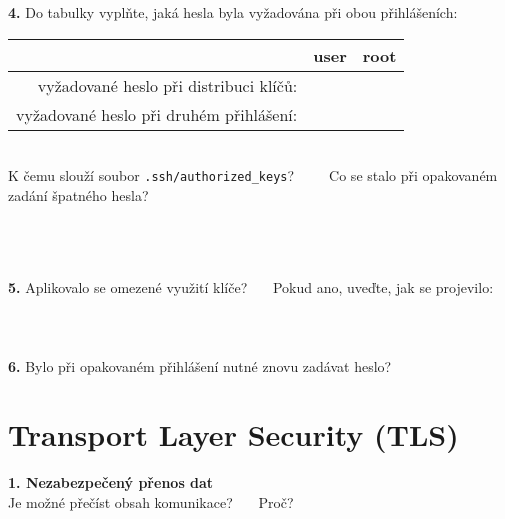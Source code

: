 \documentclass[a4paper,11pt]{article}
\begin{document}
\textbf{4.} Do tabulky vyplňte, jaká hesla byla vyžadována při obou přihlášeních:
~\\
\begin{tabular}{|r|c|c|}
\hline
~ & user & root \\
\hline
vyžadované heslo při distribuci klíčů: & \hspace{3cm} & \hspace{3cm} \\
\hline
vyžadované heslo při druhém přihlášení: & \hspace{3cm} & \hspace{3cm} \\
\hline
\end{tabular}
\vspace{1em}

~\\
K čemu slouží soubor \texttt{.ssh/authorized\_keys}?~~~~~Co se stalo při opakovaném zadání špatného hesla?
~\\
~\\
~\\
\underline{\hspace{7.8cm}}~\hspace{0.5cm}~\underline{\hspace{8.4cm}}

\newpage %

\textbf{5.} Aplikovalo se omezené využití klíče? \underline{\hspace{1cm}} ~~~Pokud ano, uveďte, jak se projevilo:
~\\
~\\
~\\
\underline{\hspace{16.5cm}}
~\\


\textbf{6.} Bylo při opakovaném přihlášení nutné znovu zadávat heslo? \underline{\hspace{1cm}}


\section{Transport Layer Security (TLS)}

\textbf{1. Nezabezpečený přenos dat}\\
Je možné přečíst obsah komunikace? \underline{\hspace{1cm}}~~~Proč?~\underline{\hspace{8cm}}
\end{document}
